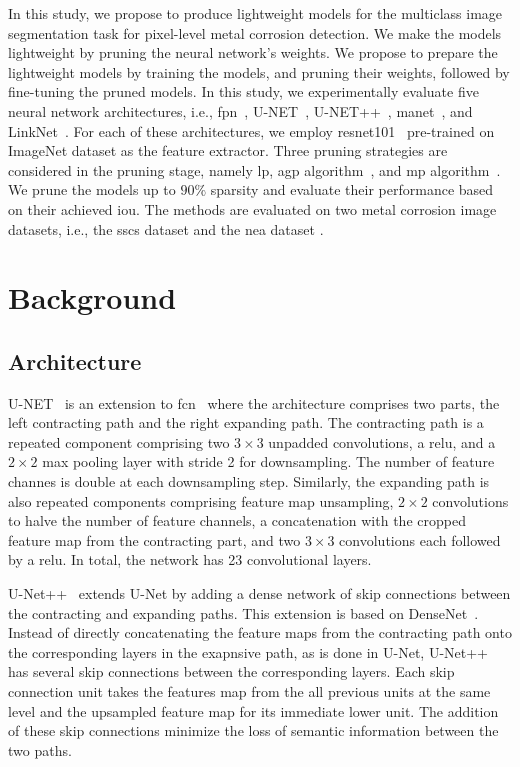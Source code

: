 \documentclass[mathematics,article,submit,pdftex,moreauthors]{Definitions/mdpi}
\begin{document}
In this study, we propose to produce lightweight
models for the multiclass image segmentation
task for pixel-level metal corrosion detection.
We make the models lightweight by pruning the neural 
network's weights. We propose to prepare the lightweight models
by training the models, and pruning their weights, followed
by fine-tuning the pruned models. 
In this study,
we experimentally evaluate five neural network
architectures, i.e., \ac{fpn}~\cite{Lin2017}, U-NET~\cite{Ronneberger2015},
U-NET++~\cite{Zhou2018}, \ac{manet}~\cite{Fan2020}, and 
LinkNet~\cite{Chaurasia2017}. For each of these architectures,
we employ \ac{resnet101}~\cite{He2016} pre-trained on ImageNet
dataset as the feature extractor. Three pruning strategies
are considered in the pruning stage, namely
\ac{lp}, \ac{agp} algorithm~\cite{Han2017},
and \ac{mp} algorithm~\cite{Sanh2020}. We prune
the models up to $90\%$ sparsity and 
evaluate their performance based on their
achieved \ac{iou}. The methods
are evaluated on two metal corrosion image datasets,
i.e., the \ac{sscs} dataset \cite{Bianchi2021Dataset,Bianchi2022Journal} and 
the \ac{nea} dataset \cite{Liu2023}. 

\section{Background}
\subsection{Architecture}
U-NET~\cite{Ronneberger2015} is an extension to
 \ac{fcn}~\cite{Long2015} where the architecture
 comprises two parts, the left contracting path
 and the right expanding path. The contracting
 path is a repeated component comprising two $3\times 3$
 unpadded convolutions, a \ac{relu}, and a $2\times 2 $ max
 pooling layer with stride 2 for downsampling. The
 number of feature channes is double at each downsampling
 step. Similarly, the expanding path is also 
 repeated components comprising feature map unsampling,
 $2\times 2$ convolutions to halve the number of feature channels, 
 a concatenation with the cropped feature map from
 the contracting part, and two $3\times 3$ convolutions
 each followed by a \ac{relu}. In total, the network
 has 23 convolutional layers.

U-Net++~\cite{Zhou2018} extends U-Net by adding a dense
network of skip connections between the contracting
and expanding paths. This extension is based on 
DenseNet~\cite{Huang2017}. Instead of directly concatenating
the feature maps from the contracting path onto the corresponding
layers in the exapnsive path, as is done in U-Net, U-Net++
has several skip connections between the corresponding layers.
Each skip connection unit takes the features map from the all
previous units at the same level and the upsampled feature map
for its immediate lower unit. The addition of these
skip connections minimize the loss of semantic information
between the two paths.
\end{document}
